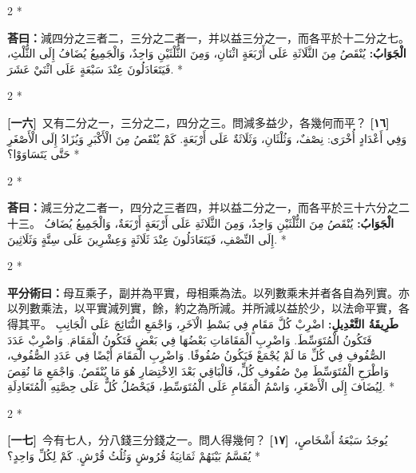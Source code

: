 \documentclass[11pt,a4paper]{article}
\newcommand{\ar}[1]{\arabicfont\beginR #1\endR}
\newcommand{\problemnum}[1]{\textbf{[\ignorespaces#1\unskip]}}
\newenvironment{bilingual}{%
  \begin{paracol}{2}%
  \switchcolumn[0]*%
}{%
  \end{paracol}%
}
\newcommand{\cnline}[1]{\switchcolumn[0]\noindent #1 \switchcolumn[1]}
\newcommand{\arline}[1]{\noindent\ar{#1} \switchcolumn[0]*}
\newenvironment{prob bilingual}{%
  \begin{paracol}{2}%
  \switchcolumn[0]*%
}{%
  \end{paracol}%
  \vspace{0.3em}%
}
\begin{document}
\begin{bilingual}
\cnline{\textcolor{answercolor}{\textbf{荅曰：}}減四分之三者二，三分之二者一，并以益三分之一，而各平於十二分之七。}
\arline{\textcolor{answercolor}{\textbf{الْجَوَابُ:}} يُنْقَصُ مِنَ الثَّلَاثَةِ عَلَى أَرْبَعَةٍ اثْنَانِ، وَمِنَ الثُّلْثَيْنِ وَاحِدٌ، وَالْجَمِيعُ يُضَافُ إِلَى الثُّلْثِ، فَيَتَعَادَلُونَ عِنْدَ سَبْعَةٍ عَلَى اثْنَيْ عَشَرَ.}
\end{bilingual}

\begin{bilingual}
\cnline{\problemnum{一六}\, 又有二分之一，三分之二，四分之三。問減多益少，各幾何而平？}
\arline{\problemnum{١٦}\, وَفِي أَعْدَادٍ أُخْرَى: نِصْفٌ، وَثُلْثَانِ، وَثَلَاثَةٌ عَلَى أَرْبَعَةٍ. كَمْ يُنْقَصُ مِنَ الْأَكْبَرِ وَيُزَادُ إِلَى الْأَصْغَرِ حَتَّى يَتَسَاوَوْا؟}
\end{bilingual}

\begin{bilingual}
\cnline{\textcolor{answercolor}{\textbf{荅曰：}}減三分之二者一，四分之三者四，并以益二分之一，而各平於三十六分之二十三。}
\arline{\textcolor{answercolor}{\textbf{الْجَوَابُ:}} يُنْقَصُ مِنَ الثُّلْثَيْنِ وَاحِدٌ، وَمِنَ الثَّلَاثَةِ عَلَى أَرْبَعَةٍ أَرْبَعَةٌ، وَالْجَمِيعُ يُضَافُ إِلَى النِّصْفِ، فَيَتَعَادَلُونَ عِنْدَ ثَلَاثَةٍ وَعِشْرِينَ عَلَى سِتَّةٍ وَثَلَاثِينَ.}
\end{bilingual}

\begin{bilingual}
\cnline{%
\textcolor{methodcolor}{\textbf{平分術曰：}}母互乘子，副并為平實，母相乘為法。以列數乘未并者各自為列實。亦以列數乘法，以平實減列實，餘，約之為所減。并所減以益於少，以法命平實，各得其平。
}
\arline{%
\textcolor{methodcolor}{\textbf{طَرِيقَةُ التَّعْدِيلِ:}} اضْرِبْ كُلَّ مَقَامٍ فِي بَسْطِ الْآخَرِ، وَاجْمَعِ النُّتَائِجَ عَلَى الْجَانِبِ فَتَكُونُ الْمُتَوَسِّطَ. وَاضْرِبِ الْمَقَامَاتِ بَعْضُهَا فِي بَعْضٍ فَتَكُونُ الْمَقَامَ. وَاضْرِبْ عَدَدَ الصُّفُوفِ فِي كُلِّ مَا لَمْ يُجْمَعْ فَيَكُونُ صُفُوفًا. وَاضْرِبِ الْمَقَامَ أَيْضًا فِي عَدَدِ الصُّفُوفِ، وَاطْرَحِ الْمُتَوَسِّطَ مِنْ صُفُوفِ كُلٍّ، فَالْبَاقِي بَعْدَ الِاخْتِصَارِ هُوَ مَا يُنْقَصُ. وَاجْمَعِ مَا نُقِصَ لِيُضَافَ إِلَى الْأَصْغَرِ، وَاسْمُ الْمَقَامِ عَلَى الْمُتَوَسِّطِ، فَيَحْصُلُ كُلٌّ عَلَى حِصَّتِهِ الْمُتَعَادِلَةِ.
}
\end{bilingual}

\begin{bilingual}
\cnline{\problemnum{一七}\, 今有七人，分八錢三分錢之一。問人得幾何？}
\arline{\problemnum{١٧}\, يُوجَدُ سَبْعَةُ أَشْخَاصٍ، يُقَسَّمُ بَيْنَهُمْ ثَمَانِيَةُ قُرُوشٍ وَثُلُثُ قُرْشٍ. كَمْ لِكُلِّ وَاحِدٍ؟}
\end{bilingual}
\end{document}
